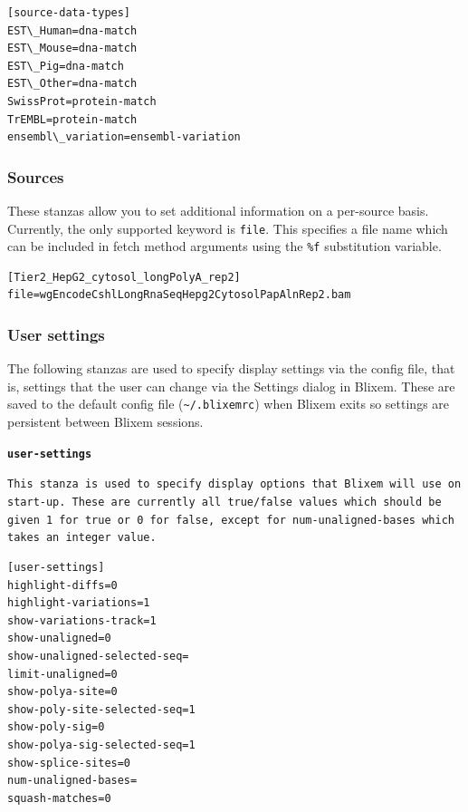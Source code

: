 \documentclass[letterpaper]{article}
\newcommand\textstyleSourceText[1]{\texttt{#1}}
\begin{document}
\begin{verbatim}
[source-data-types]
EST\_Human=dna-match
EST\_Mouse=dna-match
EST\_Pig=dna-match
EST\_Other=dna-match
SwissProt=protein-match
TrEMBL=protein-match
ensembl\_variation=ensembl-variation
\end{verbatim}

{\color[rgb]{0.30980393,0.5058824,0.7411765}\subsubsection[Sources ]{Sources }}
\hypertarget{RefHeading37771724351149}{}{
These stanzas allow you to set additional information on a per-source
basis. Currently, the only supported keyword is \texttt{file}. This
specifies a file name which can be included in fetch method arguments
using the \texttt{\%f} substitution variable. }

\begin{verbatim}
[Tier2_HepG2_cytosol_longPolyA_rep2]
file=wgEncodeCshlLongRnaSeqHepg2CytosolPapAlnRep2.bam
\end{verbatim}

{\color[rgb]{0.30980393,0.5058824,0.7411765}\subsubsection[User settings ]{User settings }}
\hypertarget{RefHeading37791724351149}{}{
The following stanzas are used to specify display settings via the
config file, that is, settings that the user can change via the
Settings dialog in Blixem. These are saved to the default config file
(\textstyleSourceText{\~{}/.blixemrc}) when Blixem exits so settings
are persistent between Blixem sessions. }

\bigskip

{\textstyleSourceText{\textrm{\textbf{user-settings}}}\textbf{ }}

{\textstyleSourceText{\textrm{This stanza is used to specify display
options that Blixem will use on start-up. These are currently all
true/false values which should be given 1 for true or 0 for false,
except for num-unaligned-bases which takes an integer value.}} }

\bigskip

\begin{verbatim}
[user-settings]
highlight-diffs=0
highlight-variations=1
show-variations-track=1
show-unaligned=0
show-unaligned-selected-seq=
limit-unaligned=0
show-polya-site=0
show-poly-site-selected-seq=1
show-poly-sig=0
show-polya-sig-selected-seq=1
show-splice-sites=0
num-unaligned-bases=
squash-matches=0
\end{verbatim}
\end{document}
